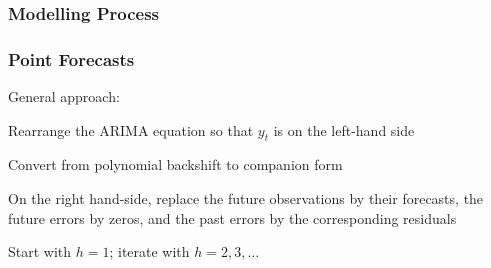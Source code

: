 \documentclass{beamer}
\newenvironment{wideitemize}{\itemize\addtolength{\itemsep}{10pt}}{\enditemize}
\begin{document}
\begin{frame} %
  \frametitle{Modelling Process}
\end{frame}



\begin{frame}
  \frametitle{Point Forecasts}

  General approach:\\
  \medskip

  \begin{wideitemize}
    \item Rearrange the ARIMA equation so that $y_t$ is on the left-hand side
    \item Convert from polynomial backshift to companion form
    \item On the right hand-side, replace the future observations by their forecasts, the future errors by zeros, and the past errors by the corresponding residuals
    \item Start with $h=1$; iterate with $h=2, 3, \dots$
  \end{wideitemize}
  
\end{frame}
\end{document}
